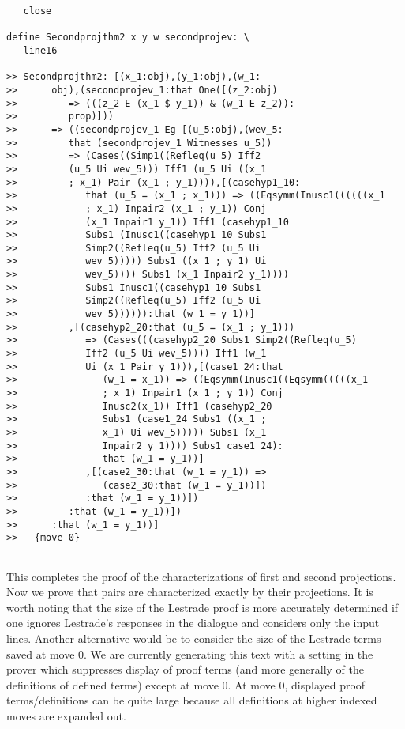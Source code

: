\documentclass[12pt]{article}
\begin{document}
\begin{verbatim}
   close

define Secondprojthm2 x y w secondprojev: \
   line16

>> Secondprojthm2: [(x_1:obj),(y_1:obj),(w_1:
>>      obj),(secondprojev_1:that One([(z_2:obj)
>>         => (((z_2 E (x_1 $ y_1)) & (w_1 E z_2)):
>>         prop)]))
>>      => ((secondprojev_1 Eg [(u_5:obj),(wev_5:
>>         that (secondprojev_1 Witnesses u_5))
>>         => (Cases((Simp1((Refleq(u_5) Iff2
>>         (u_5 Ui wev_5))) Iff1 (u_5 Ui ((x_1
>>         ; x_1) Pair (x_1 ; y_1)))),[(casehyp1_10:
>>            that (u_5 = (x_1 ; x_1))) => ((Eqsymm(Inusc1((((((x_1
>>            ; x_1) Inpair2 (x_1 ; y_1)) Conj
>>            (x_1 Inpair1 y_1)) Iff1 (casehyp1_10
>>            Subs1 (Inusc1((casehyp1_10 Subs1
>>            Simp2((Refleq(u_5) Iff2 (u_5 Ui
>>            wev_5))))) Subs1 ((x_1 ; y_1) Ui
>>            wev_5)))) Subs1 (x_1 Inpair2 y_1))))
>>            Subs1 Inusc1((casehyp1_10 Subs1
>>            Simp2((Refleq(u_5) Iff2 (u_5 Ui
>>            wev_5)))))):that (w_1 = y_1))]
>>         ,[(casehyp2_20:that (u_5 = (x_1 ; y_1)))
>>            => (Cases(((casehyp2_20 Subs1 Simp2((Refleq(u_5)
>>            Iff2 (u_5 Ui wev_5)))) Iff1 (w_1
>>            Ui (x_1 Pair y_1))),[(case1_24:that
>>               (w_1 = x_1)) => ((Eqsymm(Inusc1((Eqsymm(((((x_1
>>               ; x_1) Inpair1 (x_1 ; y_1)) Conj
>>               Inusc2(x_1)) Iff1 (casehyp2_20
>>               Subs1 (case1_24 Subs1 ((x_1 ;
>>               x_1) Ui wev_5))))) Subs1 (x_1
>>               Inpair2 y_1)))) Subs1 case1_24):
>>               that (w_1 = y_1))]
>>            ,[(case2_30:that (w_1 = y_1)) =>
>>               (case2_30:that (w_1 = y_1))])
>>            :that (w_1 = y_1))])
>>         :that (w_1 = y_1))])
>>      :that (w_1 = y_1))]
>>   {move 0}


\end{verbatim}

This completes the proof of the characterizations of first and second projections.  Now we prove that pairs are characterized exactly by their projections.  It is worth noting that
the size of the Lestrade proof is more accurately determined if one ignores Lestrade's responses in the dialogue and considers only the input lines.  Another alternative would be to consider the size of the Lestrade terms saved at move 0.  We are currently generating this text with a setting in the prover which suppresses display of proof terms
(and more generally of the definitions of defined terms) except at move 0.  At move 0, displayed proof terms/definitions can be quite large because all definitions at higher indexed moves are expanded out.
\end{document}
